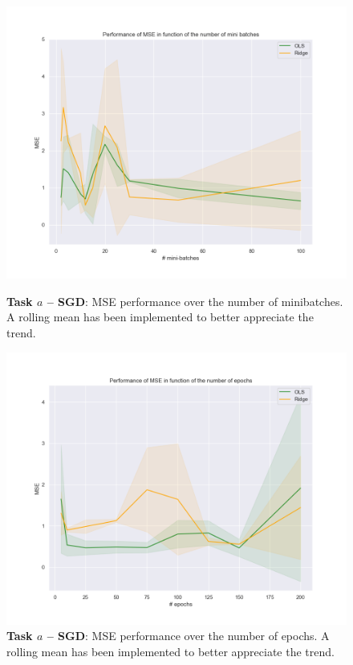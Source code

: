 \documentclass[english,notitlepage,reprint,nofootinbib]{revtex4-1}  %
\begin{document}
\begin{figure}[h]
    \centering 
    \includegraphics[scale=0.3]{SGD/SGD_minibatches.png}
    \caption{\textbf{Task $a$ – SGD}: MSE performance over the number of minibatches. A rolling mean has been implemented to better appreciate the trend.}
    \label{fig:sgd_mb}

    \centering 
    \includegraphics[scale=0.3]{SGD/SGD_epochs.png}
    \caption{\textbf{Task $a$ – SGD}: MSE performance over the number of epochs. A rolling mean has been implemented to better appreciate the trend.}
    \label{fig:sgd_epochs}
\end{figure}
\end{document}
